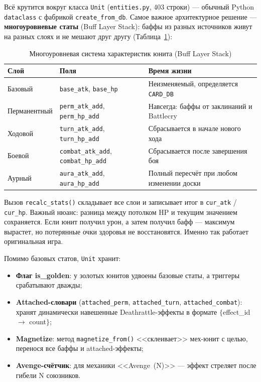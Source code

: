 \documentclass[a4paper,12pt]{extarticle}
\begin{document}
Всё крутится вокруг класса \texttt{Unit} (\texttt{entities.py}, 403 строки) --- обычный Python \texttt{dataclass} с фабрикой \texttt{create\_from\_db}. Самое важное архитектурное решение --- \textbf{многоуровневые статы} (Buff Layer Stack): баффы из разных источников живут на разных слоях и не мешают друг другу (Таблица~\ref{tab:buff_layers}):

\begin{longtable}{p{3.5cm}p{4cm}p{6cm}}
\caption{Многоуровневая система характеристик юнита (Buff Layer Stack)}\label{tab:buff_layers}\\
\toprule
\textbf{Слой} & \textbf{Поля} & \textbf{Время жизни} \\
\midrule
Базовый & \texttt{base\_atk}, \texttt{base\_hp} & Неизменяемый, определяется \texttt{CARD\_DB} \\
Перманентный & \texttt{perm\_atk\_add}, \texttt{perm\_hp\_add} & Навсегда: баффы от заклинаний и Battlecry \\
Ходовой & \texttt{turn\_atk\_add}, \texttt{turn\_hp\_add} & Сбрасывается в начале нового хода \\
Боевой & \texttt{combat\_atk\_add}, \texttt{combat\_hp\_add} & Сбрасывается после завершения боя \\
Аурный & \texttt{aura\_atk\_add}, \texttt{aura\_hp\_add} & Полный пересчёт при любом изменении доски \\
\bottomrule
\end{longtable}

Вызов \texttt{recalc\_stats()} складывает все слои и записывает итог в \texttt{cur\_atk} / \texttt{cur\_hp}. Важный нюанс: разница между потолком HP и текущим значением сохраняется. Если юнит получил урон, а затем получил бафф --- максимум вырастет, но потерянные очки здоровья не восстановятся. Именно так работает оригинальная игра.

Помимо базовых статов, \texttt{Unit} хранит:
\begin{itemize}[noitemsep]
  \item \textbf{Флаг is\_golden}: у золотых юнитов удвоены базовые статы, а триггеры срабатывают дважды;
  \item \textbf{Attached-словари} (\texttt{attached\_perm}, \texttt{attached\_turn}, \texttt{attached\_combat}): хранят динамически навешенные Deathrattle-эффекты в формате $\{$effect\_id $\to$ count$\}$;
  \item \textbf{Magnetize}: метод \texttt{magnetize\_from()} <<склеивает>> мех-юнит с целью, перенося все баффы и attached-эффекты;
  \item \textbf{Avenge-счётчик}: для механики <<Avenge~(N)>> --- эффект стреляет после гибели N союзников.
\end{itemize}
\end{document}
